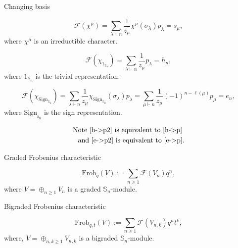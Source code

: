 \documentclass[12pt]{amsart}
\begin{document}
\begin{mdframed}[linecolor=cyan!20, linewidth=3pt,innertopmargin=8pt]
	\begin{minipage}[t]{9cm}
		\begin{bf}Changing basis\end{bf}
		\begin{equation} \mathcal{F}(\chi^\mu)=\sum_{\lambda\vdash n} \frac{1}{z_\mu}\chi^\mu(\sigma_\lambda)p_\lambda=s_\mu,
		\end{equation}
		where $\chi^\mu$ is an irreductible character.
	\end{minipage}
	\begin{minipage}[t]{9cm}
		\begin{equation}\label{h->p2} \mathcal{F}(\chi_{1_{\mathbb{S}_n}})=\sum_{\lambda\vdash n} \frac{1}{z_\mu}p_\lambda=h_n,
		\end{equation}
		where $1_{\mathbb{S}_n}$ is the trivial representation.
	\end{minipage}

	\begin{minipage}[t]{13cm}
		\begin{equation}\label{e->p2} \mathcal{F}(\chi_{\textrm{Sign}_{\mathbb{S}_n}})=\sum_{\lambda\vdash n} \frac{1}{z_\mu}\chi_{\textrm{Sign}_{\mathbb{S}_n}}(\sigma_\lambda)p_\lambda=\sum_{\mu\vdash n} \frac{1}{z_\mu}(-1)^{n-\ell(\mu)}p_\mu=e_n,
		\end{equation}
		where $\textrm{Sign}_{\mathbb{s}_n}$ is the sign representation.
	\end{minipage}
	\begin{minipage}[t]{5cm}
		\begin{align*}
			\text{Note \ref{h->p2} is equivalent to \ref{h->p} }\\ \text{and \ref{e->p2} is equivalent to \ref{e->p}.}
		\end{align*}
	\end{minipage}
\end{mdframed}

\vspace{-10pt}
\begin{mdframed}[linecolor=red!20,linewidth=3pt,innertopmargin=8pt]
	\begin{minipage}[t]{9cm}
		 \begin{bf}Graded Frobenius characteristic\end{bf}
		\begin{equation}\textrm{Frob}_q(V):=\sum_{n\geq 1}\mathcal{F}(V_n)q^n,
		\end{equation}
		where $V=\oplus_{n\geq 1}V_{n}$ is a graded $\mathbb{S}_n$-module.
	\end{minipage}
	\begin{minipage}[t]{9cm}
		 \begin{bf}Bigraded Frobenius characteristic\end{bf}
		\begin{equation}\textrm{Frob}_{q,t}(V):=\sum_{n\geq 1}\mathcal{F}(V_{n,k})q^nt^k,
		\end{equation}
		where, $V=\oplus_{n,k\geq 1}V_{n,k}$ is a bigraded $\mathbb{S}_n$-module.
	\end{minipage}
\end{mdframed}
\end{document}
